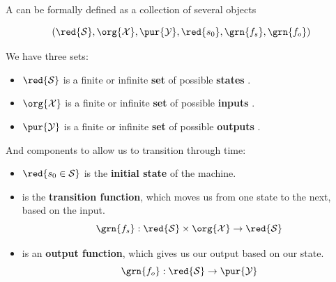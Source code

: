         \begin{definition}
            A  can be formally defined as a collection of several objects 
            
            \begin{equation*}
                (\red{\mathcal{S}}, \org{\mathcal{X}}, \pur{\mathcal{Y}}, 
                \red{s_0}, \grn{f_s}, \grn{f_o})
            \end{equation*}
            
            We have three sets:
            
            \begin{itemize}
                \item $\red{\mathcal{S}}$ is a finite or infinite \textbf{set} of possible \textbf{states} .
                
                \item $\org{\mathcal{X}}$ is a finite or infinite \textbf{set} of possible \textbf{inputs} .
                
                \item $\pur{\mathcal{Y}}$ is a finite or infinite \textbf{set} of possible \textbf{outputs} .
            \end{itemize}
            
            And components to allow us to transition through time:
            
            \begin{itemize}
                \item $\red{s_0 \in \mathcal{S}}$ is the \textbf{initial state} of the machine. 
                
                \item {} is the \textbf{transition function}, which moves us from one state to the next, based on the input.
                    \begin{equation*}
                        \grn{f_s}: \red{\mathcal{S}} \times \org{\mathcal{X}}
                        \rightarrow \red{\mathcal{S}}
                    \end{equation*}

                \item {} is an \textbf{output function}, which gives us our output based on our state.
                    \begin{equation*}
                        \grn{f_o}: \red{\mathcal{S}} \rightarrow \pur{\mathcal{Y}}
                    \end{equation*}
            \end{itemize}
        \end{definition}
        
